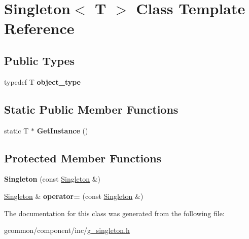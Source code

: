 \hypertarget{class_singleton}{\section{Singleton$<$ T $>$ Class Template Reference}
\label{class_singleton}
}
\subsection*{Public Types}
\begin{DoxyCompactItemize}
\item 
\hypertarget{class_singleton_ad326148a1526a06a30fb8337e7f9e6ca}{typedef T {\bfseries object\-\_\-type}}\label{class_singleton_ad326148a1526a06a30fb8337e7f9e6ca}

\end{DoxyCompactItemize}
\subsection*{Static Public Member Functions}
\begin{DoxyCompactItemize}
\item 
\hypertarget{class_singleton_aa3e375e30b25a0443eaacbfb4078ccbd}{static T $\ast$ {\bfseries Get\-Instance} ()}\label{class_singleton_aa3e375e30b25a0443eaacbfb4078ccbd}

\end{DoxyCompactItemize}
\subsection*{Protected Member Functions}
\begin{DoxyCompactItemize}
\item 
\hypertarget{class_singleton_a363d3f7d5276e6ee74966d9606df2086}{{\bfseries Singleton} (const \hyperlink{class_singleton}{Singleton} \&)}\label{class_singleton_a363d3f7d5276e6ee74966d9606df2086}

\item 
\hypertarget{class_singleton_a90761b9486d76162ab59c871b5cc030f}{\hyperlink{class_singleton}{Singleton} \& {\bfseries operator=} (const \hyperlink{class_singleton}{Singleton} \&)}\label{class_singleton_a90761b9486d76162ab59c871b5cc030f}

\end{DoxyCompactItemize}


The documentation for this class was generated from the following file\-:\begin{DoxyCompactItemize}
\item 
gcommon/component/inc/\hyperlink{g__singleton_8h}{g\-\_\-singleton.\-h}\end{DoxyCompactItemize}
